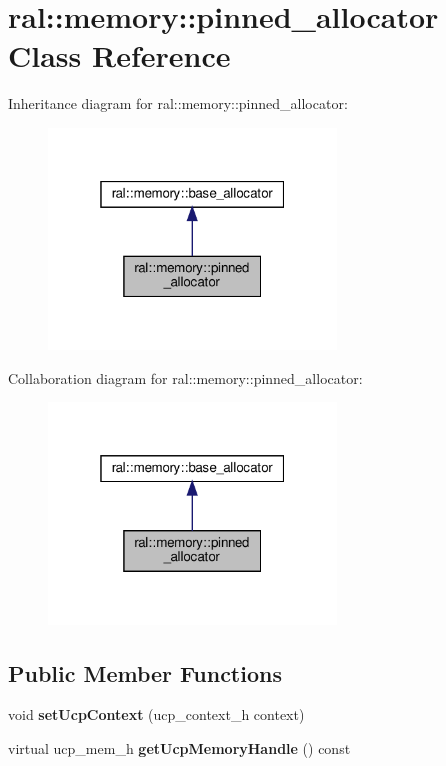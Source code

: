 \hypertarget{classral_1_1memory_1_1pinned__allocator}{}\section{ral\+:\+:memory\+:\+:pinned\+\_\+allocator Class Reference}
\label{classral_1_1memory_1_1pinned__allocator}


Inheritance diagram for ral\+:\+:memory\+:\+:pinned\+\_\+allocator\+:\nopagebreak
\begin{figure}[H]
\begin{center}
\leavevmode
\includegraphics[width=217pt]{classral_1_1memory_1_1pinned__allocator__inherit__graph}
\end{center}
\end{figure}


Collaboration diagram for ral\+:\+:memory\+:\+:pinned\+\_\+allocator\+:\nopagebreak
\begin{figure}[H]
\begin{center}
\leavevmode
\includegraphics[width=217pt]{classral_1_1memory_1_1pinned__allocator__coll__graph}
\end{center}
\end{figure}
\subsection*{Public Member Functions}
\begin{DoxyCompactItemize}
\item 
\mbox{\label{classral_1_1memory_1_1pinned__allocator_a487a8565a7efb61984a21d5751de3a30}} 
void {\bfseries set\+Ucp\+Context} (ucp\+\_\+context\+\_\+h context)
\item 
\mbox{\label{classral_1_1memory_1_1pinned__allocator_ac8ef40eac914f8f6761eb342ac2da2a2}} 
virtual ucp\+\_\+mem\+\_\+h {\bfseries get\+Ucp\+Memory\+Handle} () const
\end{DoxyCompactItemize}
